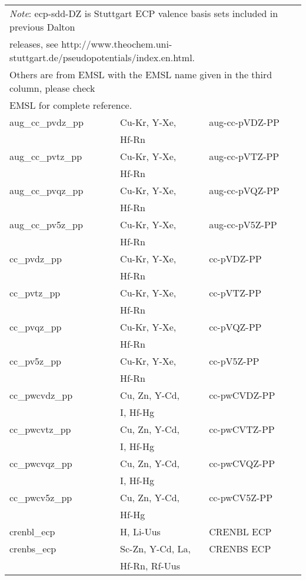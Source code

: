 \begin{longtable}{lll}
\multicolumn{3}{l}{\emph{Note}: ecp-sdd-DZ is Stuttgart ECP valence basis sets included in previous Dalton}\\
\multicolumn{3}{l}{ releases, see http://www.theochem.uni-stuttgart.de/pseudopotentials/index.en.html.}\\
\multicolumn{3}{l}{Others are from EMSL with the EMSL name given in the third column, please check}\\
\multicolumn{3}{l}{EMSL for complete reference.}\\
aug\_cc\_pvdz\_pp & Cu-Kr, Y-Xe, & aug-cc-pVDZ-PP\\
                  & Hf-Rn &\\
aug\_cc\_pvtz\_pp & Cu-Kr, Y-Xe, & aug-cc-pVTZ-PP\\
                  & Hf-Rn &\\
aug\_cc\_pvqz\_pp & Cu-Kr, Y-Xe, & aug-cc-pVQZ-PP\\
                  & Hf-Rn &\\
aug\_cc\_pv5z\_pp & Cu-Kr, Y-Xe, & aug-cc-pV5Z-PP\\
                  & Hf-Rn &\\
cc\_pvdz\_pp & Cu-Kr, Y-Xe, & cc-pVDZ-PP\\
             & Hf-Rn &\\
cc\_pvtz\_pp & Cu-Kr, Y-Xe, & cc-pVTZ-PP\\
             & Hf-Rn &\\
cc\_pvqz\_pp & Cu-Kr, Y-Xe, & cc-pVQZ-PP\\
             & Hf-Rn &\\
cc\_pv5z\_pp & Cu-Kr, Y-Xe, & cc-pV5Z-PP\\
             & Hf-Rn &\\
cc\_pwcvdz\_pp & Cu, Zn, Y-Cd, & cc-pwCVDZ-PP\\
               & I, Hf-Hg &\\
cc\_pwcvtz\_pp & Cu, Zn, Y-Cd, & cc-pwCVTZ-PP\\
               & I, Hf-Hg &\\
cc\_pwcvqz\_pp & Cu, Zn, Y-Cd, & cc-pwCVQZ-PP\\
               & I, Hf-Hg &\\
cc\_pwcv5z\_pp & Cu, Zn, Y-Cd, & cc-pwCV5Z-PP\\
               & Hf-Hg &\\
crenbl\_ecp & H, Li-Uus & CRENBL ECP\\
crenbs\_ecp & Sc-Zn, Y-Cd, La, & CRENBS ECP\\
            & Hf-Rn, Rf-Uus &\\

\end{longtable}
